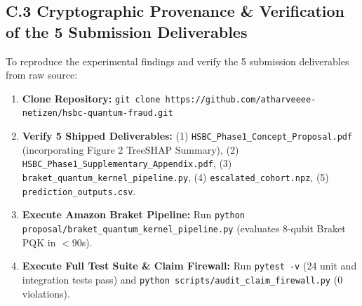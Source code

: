 \documentclass[10pt,a4paper]{article}
\begin{document}
\subsection*{C.3 Cryptographic Provenance \& Verification of the 5 Submission Deliverables}
To reproduce the experimental findings and verify the 5 submission deliverables from raw source:
\begin{enumerate}[leftmargin=*,itemsep=0.2pt,topsep=0.5pt]
\item \textbf{Clone Repository:} \texttt{git clone https://github.com/atharveeee-netizen/hsbc-quantum-fraud.git}
\item \textbf{Verify 5 Shipped Deliverables:} (1) \texttt{HSBC\_Phase1\_Concept\_Proposal.pdf} (incorporating Figure 2 TreeSHAP Summary), (2) \texttt{HSBC\_Phase1\_Supplementary\_Appendix.pdf}, (3) \texttt{braket\_quantum\_kernel\_pipeline.py}, (4) \texttt{escalated\_cohort.npz}, (5) \texttt{prediction\_outputs.csv}.
\item \textbf{Execute Amazon Braket Pipeline:} Run \texttt{python proposal/braket\_quantum\_kernel\_pipeline.py} (evaluates 8-qubit Braket PQK in $<90$s).
\item \textbf{Execute Full Test Suite \& Claim Firewall:} Run \texttt{pytest -v} (24 unit and integration tests pass) and \texttt{python scripts/audit\_claim\_firewall.py} (0 violations).
\end{enumerate}
\end{document}
